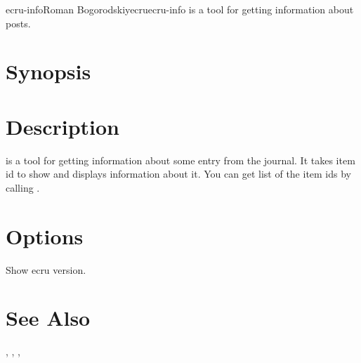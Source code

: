 \documentclass[english]{article}
\begin{document}
\begin{Name}{1}{ecru-info}{Roman Bogorodskiy}{ecru}{ecru-info}
	 is a tool for getting information about posts.
\end{Name}

\section{Synopsis}

 

 


\section{Description}
 is a tool for getting information about some entry from 
the journal. It takes item id to show and displays information about it.
You can get list of the item ids by calling .

\section{Options}

\begin{Description}\setlength{\itemsep}{0cm}
\item[\Opt{-v}] Show ecru version.
\end{Description}

\section{See Also}

, , , 
\end{document}
